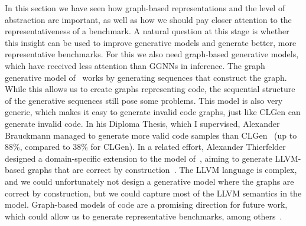 In this section we have seen how graph-based representations and the level of abstraction are important, as well as how we should pay closer attention to the representativeness of a benchmark.
A natural question at this stage is whether this insight can be used to improve generative models and generate better, more representative benchmarks.
For this we also need graph-based generative models, which have received less attention than \acp{GGNN} in inference.
The graph generative model of~\cite{li2018learning} works by generating sequences that construct the graph.
While this allows us to create graphs representing code, the sequential structure of the generative sequences still pose some problems.
This model is also very generic, which makes it easy to generate invalid code graphs, just like CLGen can generate invalid code.
In his Diploma Thesis, which I supervised, Alexander Brauckmann managed to generate more valid code samples than CLGen~\cite{Brauckmann-diplom20} (up to 88\%, compared to 38\% for CLGen).
In a related effort, Alexander Thierfelder designed a domain-specific extension to the model of~\cite{li2018learning}, aiming to generate LLVM-based graphs that are correct by construction~\cite{Thierfelder-master20}.
The LLVM language is complex, and we could unfortunately not design a generative model where the graphs are correct by construction, but we could capture most of the LLVM semantics in the model.
Graph-based models of code are a promising direction for future work, which could allow us to generate representative benchmarks, among others~\cite{leather_fdl20}.
